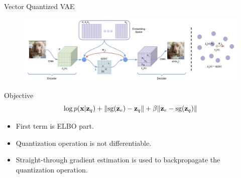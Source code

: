 \begin{frame}{Vector Quantized VAE}
	\begin{figure}
		\centering
		\includegraphics[width=\linewidth]{figs/vqvae}
	\end{figure}
	\begin{block}{Objective}
		\vspace{-0.3cm}
		\[
			\log p(\mathbf{x} | \mathbf{z}_q) + \| \text{sg} (\mathbf{z}_e) - \mathbf{z}_q \| + \beta \| \mathbf{z}_e - \text{sg}(\mathbf{z}_q) \|
		\]
	\end{block}
	\begin{itemize}
		\item First term is ELBO part.
		\item Quantization operation is not differentiable.
		\item Straight-through gradient estimation is used to backpropagate the quantization operation.
	\end{itemize}

\end{frame}

